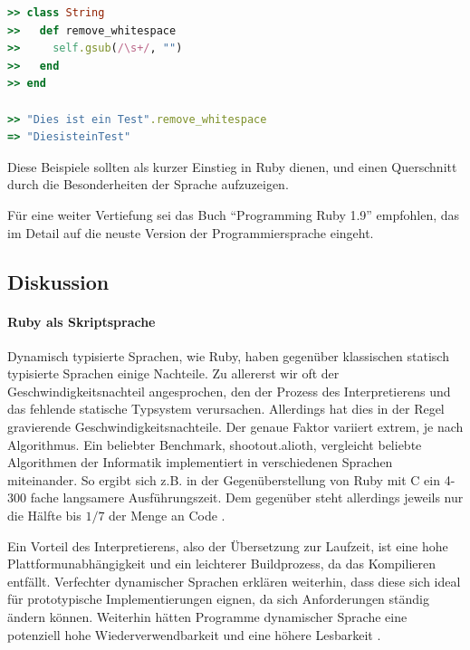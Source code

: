 \begin{lstlisting}[language=Ruby,label=Ruby Beispiel offene Klassen,caption=Ruby Beispiel offene Klassen]
>> class String
>>   def remove_whitespace
>>     self.gsub(/\s+/, "")
>>   end
>> end

>> "Dies ist ein Test".remove_whitespace
=> "DiesisteinTest"

\end{lstlisting}

Diese Beispiele sollten als kurzer Einstieg in Ruby dienen, und einen Querschnitt durch die Besonderheiten der Sprache aufzuzeigen.

Für eine weiter Vertiefung sei das Buch "`Programming Ruby 1.9"' empfohlen, das im Detail auf die neuste Version der Programmiersprache eingeht. %

\subsection{Diskussion}

\paragraph{Ruby als Skriptsprache}
Dynamisch typisierte Sprachen, wie Ruby, haben gegenüber klassischen statisch typisierte Sprachen einige Nachteile. Zu allererst wir oft der Geschwindigkeitsnachteil angesprochen, den der Prozess des Interpretierens und das fehlende statische Typsystem verursachen.
Allerdings hat dies in der Regel gravierende Geschwindigkeitsnachteile. Der genaue Faktor variiert extrem, je nach Algorithmus. Ein beliebter Benchmark, shootout.alioth, vergleicht beliebte Algorithmen der Informatik implementiert in verschiedenen Sprachen miteinander. So ergibt sich z.B. in der Gegenüberstellung von Ruby mit C ein 4-300 fache langsamere Ausführungszeit. Dem gegenüber steht allerdings jeweils nur die Hälfte bis $1/7$ der Menge an Code \citep{computer_language_benchmarks_game_ruby_2011}.

Ein Vorteil des Interpretierens, also der Übersetzung zur Laufzeit, ist eine hohe Plattformunabhängigkeit und ein leichterer Buildprozess, da das Kompilieren entfällt. 
Verfechter dynamischer Sprachen erklären weiterhin, dass diese sich ideal für prototypische Implementierungen eignen, da sich Anforderungen ständig ändern können. Weiterhin hätten Programme dynamischer Sprache eine potenziell hohe Wiederverwendbarkeit und eine höhere Lesbarkeit \citep{meijer_static_2005} \citep{ousterhout_scripting:_1998}.

